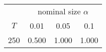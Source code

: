 % 
\begin{tabular}{cccc}
  \hline
  & \multicolumn{3}{c}{nominal size $\alpha$} \\
 $T$ & 0.01 & 0.05 & 0.1 \\
 \hline
250 & 0.500 & 1.000 & 1.000 \\ 
   \hline
\end{tabular}

